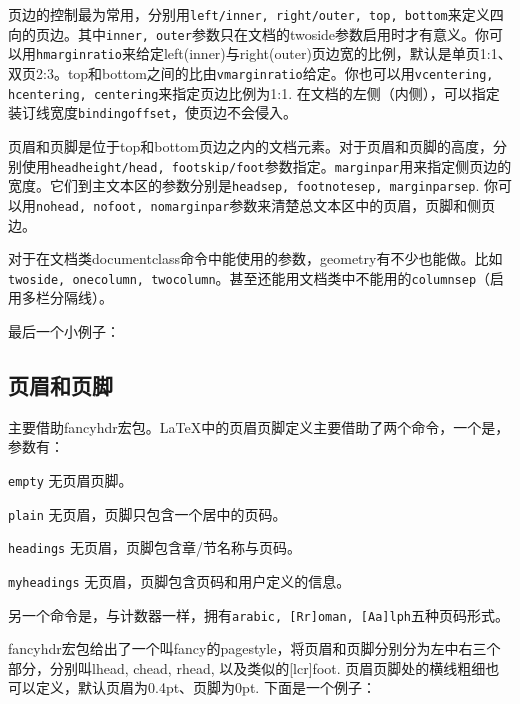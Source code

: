 {页边的控制最为常用，分别用\texttt{left/inner, right/outer, top, bottom}来定义四向的页边。其中\texttt{inner, outer}参数只在文档的twoside参数启用时才有意义。你可以用\texttt{hmarginratio}来给定left(inner)与right(outer)页边宽的比例，默认是单页1:1、双页2:3。top和bottom之间的比由\texttt{vmarginratio}给定。你也可以用\texttt{vcentering, hcentering, centering}来指定页边比例为1:1. 在文档的左侧（内侧），可以指定装订线宽度\texttt{bindingoffset}，使页边不会侵入。

页眉和页脚是位于top和bottom页边之内的文档元素。对于页眉和页脚的高度，分别使用\texttt{headheight/head, footskip/foot}参数指定。\texttt{marginpar}用来指定侧页边的宽度。它们到主文本区的参数分别是\texttt{headsep, footnotesep, marginparsep}. 你可以用\texttt{nohead, nofoot, nomarginpar}参数来清楚总文本区中的页眉，页脚和侧页边。

对于在文档类documentclass命令中能使用的参数，geometry有不少也能做。比如\texttt{twoside, onecolumn, twocolumn}。甚至还能用文档类中不能用的\texttt{columnsep}（启用多栏分隔线）。

最后一个小例子：
\begin{latex}{}
\usepackage[marginpar=3cm, includemp]{package}
\end{latex}

\subsection{页眉和页脚}
主要借助fancyhdr宏包。\LaTeX 中的页眉页脚定义主要借助了两个命令，一个是\latexline{\\pagestyle}，参数有：
\begin{feai}
\item[\texttt{empty}] 无页眉页脚。
\item[\texttt{plain}] 无页眉，页脚只包含一个居中的页码。
\item[\texttt{headings}] 无页眉，页脚包含章/节名称与页码。
\item[\texttt{myheadings}] 无页眉，页脚包含页码和用户定义的信息。
\end{feai}

另一个命令是\latexline{\\pagenumbering}，与计数器一样，拥有\texttt{arabic, [Rr]oman, [Aa]lph}五种页码形式。

fancyhdr宏包给出了一个叫fancy的pagestyle，将页眉和页脚分别分为左中右三个部分，分别叫lhead, chead, rhead, 以及类似的[lcr]foot. 页眉页脚处的横线粗细也可以定义，默认页眉为0.4pt、页脚为0pt. 下面是一个例子：
\begin{latex}{}
\usepackage{fancyhdr}
\pagestyle{fancy}
  \lhead{}
  \chead{}
  \cfoot{\thepage}
\renewcommand{\headrulewidth}{0.4pt}
\renewcommand{\footrulewidth}{0.4pt}
\end{latex}

}
